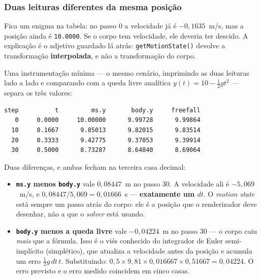 \subsubsection{Duas leituras diferentes da mesma posição}
\label{sec:collision-interpolacao}

Fica um enigma na tabela: no passo 0 a velocidade já é $-0{,}1635$~m/s, mas a
posição ainda é \texttt{10.0000}. Se o corpo tem velocidade, ele deveria ter
descido. A explicação é o adjetivo guardado lá atrás: \texttt{getMotionState()}
devolve a transformação \textbf{interpolada}, e não a transformação do corpo.

Uma instrumentação mínima --- o mesmo cenário, imprimindo as duas leituras lado a
lado e comparando com a queda livre analítica $y(t) = 10 - \tfrac{1}{2}gt^2$ ---
separa os três valores:

\begin{lstlisting}[style=bt, language=bash,
    caption={Medição comparando \texttt{motionState}, \texttt{btRigidBody::getWorldTransform} e a solução analítica.}]
step          t         ms.y       body.y     freefall
   0     0.0000     10.00000      9.99728      9.99864
  10     0.1667      9.85013      9.82015      9.83514
  20     0.3333      9.42775      9.37053      9.39914
  30     0.5000      8.73287      8.64840      8.69064
\end{lstlisting}

Duas diferenças, e ambas fecham na terceira casa decimal:

\begin{itemize}
  \item \textbf{\texttt{ms.y} menos \texttt{body.y}} vale $0{,}08447$~m no passo
        30. A velocidade ali é $-5{,}069$~m/s, e
        $0{,}08447 / 5{,}069 = 0{,}01666$~s --- \textbf{exatamente um $dt$}. O
        \emph{motion state} está sempre um passo atrás do corpo: ele é a posição
        que o renderizador deve desenhar, não a que o \emph{solver} está usando.
  \item \textbf{\texttt{body.y} menos a queda livre} vale $-0{,}04224$~m no
        passo 30 --- o corpo caiu \emph{mais} que a fórmula. Isso é o viés
        conhecido do integrador de Euler semi-implícito (simplético), que
        atualiza a velocidade antes da posição e acumula um erro
        $\tfrac{1}{2}g\,dt\,t$. Substituindo:
        $0{,}5 \times 9{,}81 \times 0{,}016667 \times 0{,}51667 = 0{,}04224$.
        O erro previsto e o erro medido coincidem em cinco casas.
\end{itemize}

